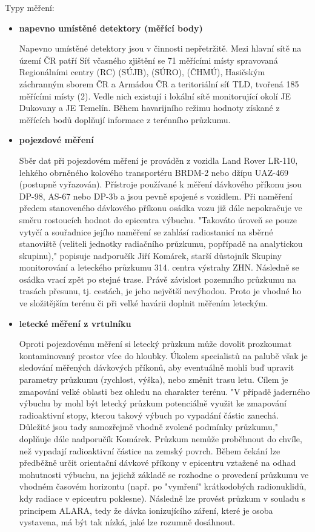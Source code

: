 Typy měření:
\begin{itemize}
	\item \textbf{napevno umístěné detektory (měřící body)}
	
	Napevno umístěné detektory jsou v činnosti nepřetržitě. Mezi hlavní sítě na území ČR patří Síť včasného zjištění se 71 měřícími místy spravovaná Regionálními centry (RC) {\zk(SÚJB)}, {\zk(SÚRO)}, {\zk(ČHMÚ)}, Hasičským záchranným sborem ČR a Armádou ČR a teritoriální síť TLD, tvořená 185 měřícími místy (2). Vedle nich existují i lokální sítě monitorující okolí JE Dukovany a JE Temelín.
	Během havarijního režimu hodnoty získané z měřících bodů doplňují informace z terénního průzkumu. 
	
	
	\item \textbf{pojezdové měření}
	
	Sběr dat při pojezdovém měření je prováděn z vozidla Land Rover LR-110, lehkého obrněného kolového transportéru BRDM-2 nebo džípu UAZ-469 (postupně vyřazován). Přístroje používané k měření dávkového příkonu jsou DP-98, AS-67 nebo DP-3b a jsou pevně spojené s vozidlem. 
	Při naměření předem stanoveného dávkového příkonu osádka vozu již dále nepokračuje ve směru rostoucích hodnot do epicentra výbuchu. "Takováto úroveň se pouze vytyčí a souřadnice jejího naměření se zahlásí radiostanicí na sběrné stanoviště (veliteli jednotky radiačního průzkumu, popřípadě na analytickou skupinu)," popisuje nadporučík Jiří Komárek, starší důstojník Skupiny monitorování a leteckého průzkumu 314. centra výstrahy ZHN. Následně se osádka vrací zpět po stejné trase. 
	Právě závislost pozemního průzkumu na trasách přesunu, tj. cestách, je jeho největší nevýhodou. Proto je vhodné ho ve složitějším terénu či při velké havárii doplnit měřením leteckým.
	
	\item \textbf{letecké měření z vrtulníku}
	
	Oproti pojezdovému měření si letecký průzkum může dovolit prozkoumat kontaminovaný prostor více do hloubky. Úkolem specialistů na palubě však je sledování měřených dávkových příkonů, aby eventuálně mohli buď upravit parametry průzkumu (rychlost, výška), nebo změnit trasu letu. Cílem je zmapování velké oblasti bez ohledu na charakter terénu. 
	"V případě jaderného výbuchu by mohl být letecký průzkum potenciálně využit ke zmapování radioaktivní stopy, kterou takový výbuch po vypadání částic zanechá. Důležité jsou tady samozřejmě vhodně zvolené podmínky průzkumu," doplňuje dále nadporučík Komárek. 
	Průzkum nemůže proběhnout do chvíle, než vypadají radioaktivní částice na zemský povrch. Během čekání lze předběžně určit orientační dávkové příkony v epicentru vztažené na odhad mohutnosti výbuchu, na jejichž základě se rozhodne o provedení průzkumu ve vhodném časovém horizontu (např. po "vymření" krátkodobých radionuklidů, kdy radiace v epicentru poklesne). Následně lze provést průzkum v souladu s principem ALARA, tedy že dávka ionizujícího záření, které je osoba vystavena, má být tak nízká, jaké lze rozumně dosáhnout.
	

\end{itemize}

